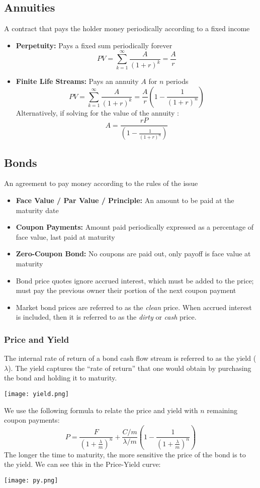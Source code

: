 \documentclass[11pt]{article}
\begin{document}
\subsection{Annuities}
A contract that pays the holder money periodically according to a fixed income 
\begin{itemize}
\item \textbf{Perpetuity:} Pays a fixed sum periodically forever
$$ PV = \sum_{k=1}^{\infty} \frac{A}{(1+r)^k} = \frac{A}{r} $$ 
\item \textbf{Finite Life Streams:}  Pays an annuity $A$ for $n$ periods
$$ PV = \sum_{k=1}^{\infty} \frac{A}{(1+r)^k} = \frac{A}{r} \left( 1 - \frac{1}{(1+r)^n} \right)$$ 
Alternatively, if solving for the value of the annuity :
$$ A = \frac{r P}{ \left( 1 - \frac{1}{(1+r)^n} \right) } $$ 
\end{itemize}
\subsection{Bonds}
An agreement to pay money according to the rules of the issue
\begin{itemize}
\item \textbf{Face Value / Par Value / Principle:} An amount to be paid at the maturity date 
\item \textbf{Coupon Payments:} Amount paid periodically expressed as a percentage of face value, last paid at maturity 
\item \textbf{Zero-Coupon Bond:} No coupons are paid out, only payoff is face value at maturity
\item Bond price quotes ignore accrued interest, which must be added to the price; must pay the previous owner their portion of the next coupon payment
\item Market bond prices are referred to as the \textit{clean} price. When accrued interest is included, then it is referred to as the \textit{dirty} or \textit{cash} price.
\end{itemize}

\subsubsection{Price and Yield}
The internal rate of return of a bond cash flow stream is referred to as the yield ($\lambda$). The yield captures the “rate of return” that one would obtain by purchasing the bond and holding it to maturity. 
\begin{center}
\texttt{[image: yield.png]} 
\end{center}
We use the following formula to relate the price and yield with $n$ remaining coupon payments:
$$ P = \frac{F}{\left(1+\frac{\lambda}{m}\right)^n} + \frac{C/m}{\lambda / m } \left(1 - \frac{1}{\left(1+\frac{\lambda}{m}\right)^n}\right) $$
The longer the time to maturity, the more sensitive the price of the bond is to the yield.  We can see this in the Price-Yield curve:
\begin{center}
\texttt{[image: py.png]} 
\end{center}
\end{document}
